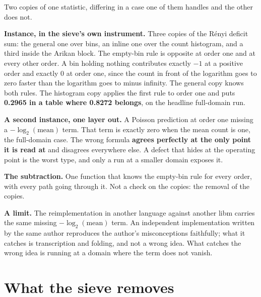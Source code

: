 Two copies of one statistic, differing in a case one of them handles and the other does not.

\textbf{Instance, in the sieve's own instrument.} Three copies of the Rényi deficit sum: the general one over bins, an inline one over the count histogram, and a third inside the Arikan block. The empty-bin rule is opposite at order one and at every other order. A bin holding nothing contributes exactly \(-1\) at a positive order and exactly \(0\) at order one, since the count in front of the logarithm goes to zero faster than the logarithm goes to minus infinity. The general copy knows both rules. The histogram copy applies the first rule to order one and puts \textbf{0.2965 in a table where 0.8272 belongs}, on the headline full-domain run.

\textbf{A second instance, one layer out.} A Poisson prediction at order one missing a \(-\log_2(\mathrm{mean})\) term. That term is exactly zero when the mean count is one, the full-domain case. The wrong formula \textbf{agrees perfectly at the only point it is read at} and disagrees everywhere else. A defect that hides at the operating point is the worst type, and only a run at a smaller domain exposes it.

\textbf{The subtraction.} One function that knows the empty-bin rule for every order, with every path going through it. Not a check on the copies: the removal of the copies.

\textbf{A limit.} The reimplementation in another language against another libm carries the same missing \(-\log_2(\mathrm{mean})\) term. An independent implementation written by the same author reproduces the author's misconceptions faithfully; what it catches is transcription and folding, and not a wrong idea. What catches the wrong idea is running at a domain where the term does not vanish.

\section{What the sieve removes}

